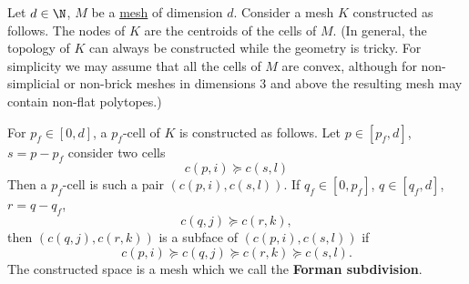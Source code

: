 \begin{definition}
  Let
    $d \in \N$,
    $M$ be a \hyperref[cmc:mesh:definition]{mesh} of dimension $d$.
  Consider a mesh $K$ constructed as follows.
  The nodes of $K$ are the centroids of the cells of $M$.
  (In general, the topology of $K$ can always be constructed while the geometry
  is tricky.
  For simplicity we may assume that all the cells of $M$ are convex,
  although for non-simplicial or non-brick meshes in dimensions $3$ and above
  the resulting mesh may contain non-flat polytopes.)

  For $p_f \in [0, d]$, a $p_f$-cell of $K$ is constructed as follows.
  Let $p \in [p_f, d]$, $s = p - p_f$ consider two cells
  \begin{equation}
    c(p, i) \succeq c(s, l)
  \end{equation}
  Then a $p_f$-cell is such a pair $(c(p, i), c(s, l))$.
  If $q_f \in [0, p_f]$, $q \in [q_f, d]$, $r = q - q_f$,
  \begin{equation}
    c(q, j) \succeq c(r, k),
  \end{equation}
  then $(c(q, j), c(r, k))$ is a subface of $(c(p, i), c(s, l))$ if
  \begin{equation}
    c(p, i) \succeq c(q, j) \succeq c(r, k) \succeq c(s, l).
  \end{equation}
  The constructed space is a mesh which we call the \textbf{Forman subdivision}.
\end{definition}
